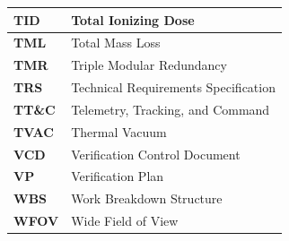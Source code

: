 {\begin{longtable}{|>{\raggedright\arraybackslash}p{3.0cm}|>{\raggedright\arraybackslash}p{12.4cm}|}
    \textbf{TID}    & Total Ionizing Dose \\ \hline
    \textbf{TML}    & Total Mass Loss \\ \hline
    \textbf{TMR}    & Triple Modular Redundancy \\ \hline
    \textbf{TRS}    & Technical Requirements Specification \\ \hline
    \textbf{TT\&C}  & Telemetry, Tracking, and Command \\ \hline
    \textbf{TVAC}   & Thermal Vacuum \\ \hline
    \textbf{VCD}    & Verification Control Document \\ \hline
    \textbf{VP}     & Verification Plan \\ \hline
    \textbf{WBS}    & Work Breakdown Structure \\ \hline
    \textbf{WFOV}   & Wide Field of View \\ \hline
\end{longtable}\addtocounter{table}{-1}}

\newpage
